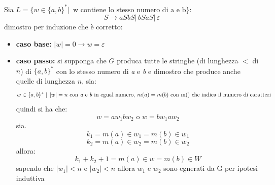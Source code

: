 \begin{example}
	Sia $L=\{w\in\{a,b\}^*|\, \mbox{ w contiene lo stesso numero di a e b}\}$:
	$$S\to aSbS|\,bSaS|\, \varepsilon$$
	dimostro per induzione che è corretto:
	\begin{itemize}
		\item \textbf{caso base:} $|w|=0\to w=\varepsilon$
		\item \textbf{caso passo:} si supponga che $G$ produca tutte le stringhe (di lunghezza $<$ di $n$) di $\{a,b\}^*$ con lo stesso numero di \textit{a} e \textit{b} e dimostro che produce anche quelle di lunghezza $n$, sia:
		      $$w\in \{a,b\}^* \mid\, |w|=n \mbox{ con\textit{ a} e \textit{b} in egual numero, }m(a)=m(b) \mbox{ con m() che indica il numero di caratteri}$$
		      quindi si ha che:
		      $$w=aw_1bw_2\mbox{ o } w=bw_1aw_2$$
		      sia.
		      $$k_1=m(a)\in w_1=m(b)\in w_1$$
		      $$k_2=m(a)\in w_2=m(b)\in w_2$$
		      allora:
		      $$k_1+k_2+1=m(a)\in w= m(b)\in W$$
		      sapendo che $|w_1|<n$ e $|w_2|<n$ allora $w_1$ e $w_2$ sono egnerati da G per ipotesi induttiva
	\end{itemize}
\end{example}

